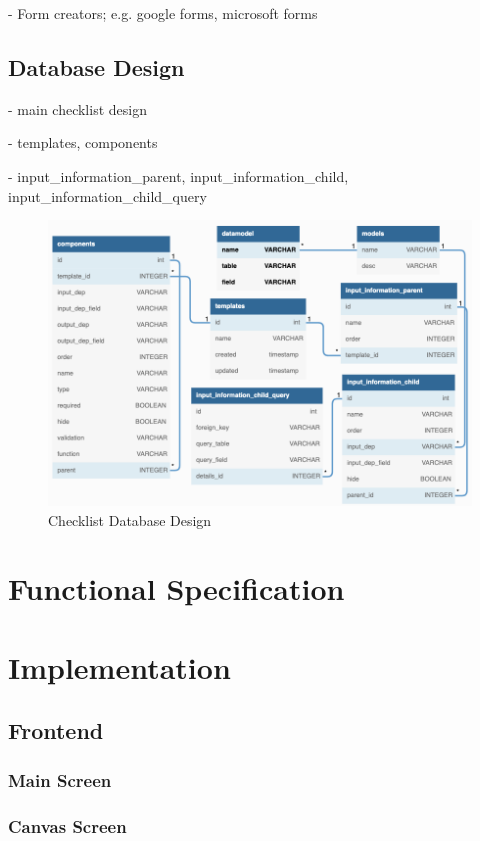 - Form creators; e.g. google forms, microsoft forms

\subsection{Database Design}
- main checklist design

- templates, components

- input\_information\_parent, input\_information\_child, input\_information\_child\_query

\begin{figure}[ht]
    \centering
    \includegraphics[width=\textwidth]{overleaf/images/checklist_db_design.png}
    \caption{Checklist Database Design}
    \label{fig:checklist_db_design}
\end{figure}

\section{Functional Specification}


\section{Implementation}
\subsection{Frontend}

\subsubsection{Main Screen}

\subsubsection{Canvas Screen}

